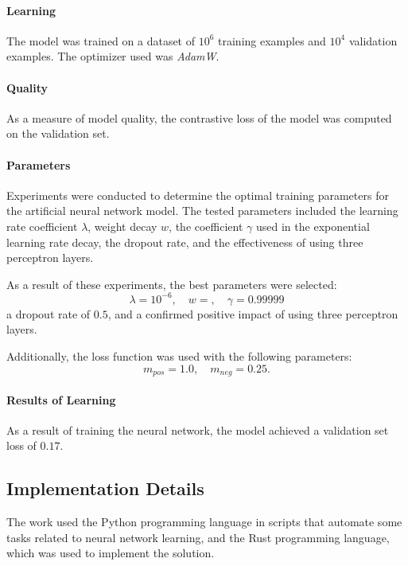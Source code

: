 \documentclass[pdflatex,sn-vancouver-num]{sn-jnl}%
\begin{document}
                \paragraph{Learning}
                The model was trained on a dataset of $10^{6}$ training examples and $10^{4}$ validation examples. The optimizer used was \textit{AdamW}\cite{Loshchilov2017DecoupledWD}.

                \paragraph{Quality}
                As a measure of model quality, the contrastive loss of the model was computed on the validation set.

                \paragraph{Parameters}
                Experiments were conducted to determine the optimal training parameters for the artificial neural network model. The tested parameters included the learning rate coefficient \( \lambda \), weight decay \( w \), the coefficient \( \gamma \) used in the exponential learning rate decay, the dropout rate, and the effectiveness of using three perceptron layers.

                As a result of these experiments, the best parameters were selected:
                \[
                \lambda = 10^{-6}, \quad w = , \quad \gamma = 0.99999
                \]
                a dropout rate of \( 0.5 \), and a confirmed positive impact of using three perceptron layers.

                Additionally, the loss function was used with the following parameters:
                \[
                m_{pos} = 1.0, \quad m_{neg} = 0.25.
                \]


                \paragraph{Results of Learning}
                As a result of training the neural network, the model achieved a validation set loss of $0.17$.

        \subsection{Implementation Details}
            The work used the Python programming language\cite{Python} in scripts that automate some tasks related to neural network learning, and the Rust programming language\cite{Rust}, which was used to implement the solution.
\end{document}
